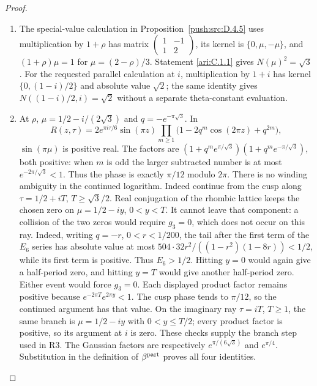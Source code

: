 \begin{proof}
\begin{enumerate}[label=\arabic*.,leftmargin=*]
\item The special-value calculation in Proposition~\ref{push:src:D.4.5}
uses multiplication by $1+\rho$ has matrix
$\left(\begin{smallmatrix}1&-1\\1&2\end{smallmatrix}\right)$,
its kernel is $\{0,\mu,-\mu\}$, and $(1+\rho)\mu=1$ for
$\mu=(2-\rho)/3$. Statement \ref{ari:C.1.1} gives $N(\mu)^2=\sqrt3$.
For the requested parallel calculation at $i$, multiplication by $1+i$
has kernel $\{0,(1-i)/2\}$ and absolute value $\sqrt2$; the same
identity gives $N((1-i)/2,i)=\sqrt2$ without a separate theta-constant
evaluation.

\item At $\rho$, $\mu=1/2-i/(2\sqrt3)$ and $q=-e^{-\pi\sqrt3}$. In
\[
 R(z,\tau)=2e^{\pi i\tau/6}\sin(\pi z)
 \prod_{m\ge1}\bigl(1-2q^m\cos(2\pi z)+q^{2m}\bigr),
\]
$\sin(\pi\mu)$ is positive real. The factors are
$(1+q^m e^{\pi/\sqrt3})(1+q^m e^{-\pi/\sqrt3})$, both positive:
when $m$ is odd the larger subtracted number is at most
$e^{-2\pi/\sqrt3}<1$. Thus the phase is exactly $\pi/12$ modulo
$2\pi$. There is no winding ambiguity in the continued logarithm.
Indeed continue from the cusp along $\tau=1/2+iT$,
$T\ge\sqrt3/2$. Real conjugation of the rhombic lattice keeps the
chosen zero on $\mu=1/2-iy$, $0<y<T$. It cannot leave that component:
a collision of the two zeros would require $g_3=0$, which does not
occur on this ray. Indeed, writing $q=-r$, $0<r<1/200$,
the tail after the first term of the $E_6$ series has absolute value
at most $504\cdot32r^2/((1-r^2)(1-8r))<1/2$, while its
first term is positive. Thus $E_6>1/2$. Hitting $y=0$ would again give a half-period zero, and
hitting $y=T$ would give another half-period zero. Either event
would force $g_3=0$. Each displayed product factor remains
positive because $e^{-2\pi T}e^{2\pi y}<1$. The cusp phase tends to
$\pi/12$, so the continued argument has that value. On the imaginary
ray $\tau=iT$, $T\ge1$, the same branch is
$\mu=1/2-iy$ with $0<y\le T/2$; every product factor is positive,
so its argument at $i$ is zero. These checks supply the branch step
used in R3. The Gaussian factors are respectively
$e^{\pi/(6\sqrt3)}$ and $e^{\pi/4}$. Substitution in the definition of
$\beta^{\rm part}$ proves all four identities.
\end{enumerate}
\end{proof}

